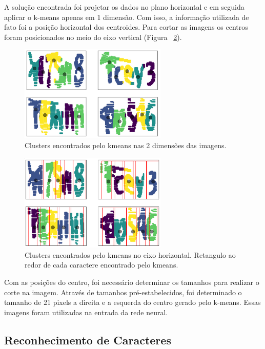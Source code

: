 \documentclass[11pt]{article}
\begin{document}
A solução encontrada foi projetar os dados no plano horizontal e em seguida aplicar o k-means apenas em 1 dimensão. Com isso, a informação utilizada de fato foi a posição horizontal dos centroides. Para cortar as imagens os centros foram posicionados no meio do eixo vertical (Figura ~\ref{fig:kmeans1d}).

  \begin{figure}
        {\centering
        \includegraphics[width=70mm]{images/2dkmeans.png}
        \caption{Clusters encontrados pelo kmeans nas 2 dimensões das imagens.}
        \label{fig:kmeans2d}\par}
  \end{figure}

  \begin{figure}
        {\centering
        \includegraphics[width=70mm]{images/1dkmeans.png}
        \caption{Clusters encontrados pelo kmeans no eixo horizontal. Retangulo ao redor de cada caractere encontrado pelo kmeans.}
        \label{fig:kmeans1d}\par}
  \end{figure}

Com as posições do centro, foi necessário determinar os tamanhos para realizar o corte na imagem. Através de tamanhos pré-estabelecidos, foi determinado o tamanho de 21 pixels a direita e a esquerda do centro gerado pelo k-means. Essas imagens foram utilizadas na entrada da rede neural. 

\subsection{Reconhecimento de Caracteres}
\label{ssec:convnet}
\end{document}
